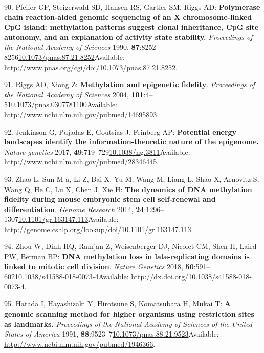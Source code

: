 \documentclass[
]{book}
\begin{document}
\leavevmode\hypertarget{ref-Pfeifer1990a}{}%
90. Pfeifer GP, Steigerwald SD, Hansen RS, Gartler SM, Riggs AD: \textbf{Polymerase chain reaction-aided genomic sequencing of an X chromosome-linked CpG island: methylation patterns suggest clonal inheritance, CpG site autonomy, and an explanation of activity state stability.} \emph{Proceedings of the National Academy of Sciences} 1990, \textbf{87}:8252--8256\href{https://doi.org/10.1073/pnas.87.21.8252}{10.1073/pnas.87.21.8252}Available: \url{http://www.pnas.org/cgi/doi/10.1073/pnas.87.21.8252}.

\leavevmode\hypertarget{ref-Riggs2004a}{}%
91. Riggs AD, Xiong Z: \textbf{Methylation and epigenetic fidelity}. \emph{Proceedings of the National Academy of Sciences} 2004, \textbf{101}:4--5\href{https://doi.org/10.1073/pnas.0307781100}{10.1073/pnas.0307781100}Available: \url{http://www.ncbi.nlm.nih.gov/pubmed/14695893}.

\leavevmode\hypertarget{ref-Jenkinson2017}{}%
92. Jenkinson G, Pujadas E, Goutsias J, Feinberg AP: \textbf{Potential energy landscapes identify the information-theoretic nature of the epigenome.} \emph{Nature genetics} 2017, \textbf{49}:719--729\href{https://doi.org/10.1038/ng.3811}{10.1038/ng.3811}Available: \url{http://www.ncbi.nlm.nih.gov/pubmed/28346445}.

\leavevmode\hypertarget{ref-Zhao2014}{}%
93. Zhao L, Sun M-a, Li Z, Bai X, Yu M, Wang M, Liang L, Shao X, Arnovitz S, Wang Q, He C, Lu X, Chen J, Xie H: \textbf{The dynamics of DNA methylation fidelity during mouse embryonic stem cell self-renewal and differentiation}. \emph{Genome Research} 2014, \textbf{24}:1296--1307\href{https://doi.org/10.1101/gr.163147.113}{10.1101/gr.163147.113}Available: \url{http://genome.cshlp.org/lookup/doi/10.1101/gr.163147.113}.

\leavevmode\hypertarget{ref-Zhou2018}{}%
94. Zhou W, Dinh HQ, Ramjan Z, Weisenberger DJ, Nicolet CM, Shen H, Laird PW, Berman BP: \textbf{DNA methylation loss in late-replicating domains is linked to mitotic cell division}. \emph{Nature Genetics} 2018, \textbf{50}:591--602\href{https://doi.org/10.1038/s41588-018-0073-4}{10.1038/s41588-018-0073-4}Available: \url{http://dx.doi.org/10.1038/s41588-018-0073-4}.

\leavevmode\hypertarget{ref-Hatada1991}{}%
95. Hatada I, Hayashizaki Y, Hirotsune S, Komatsubara H, Mukai T: \textbf{A genomic scanning method for higher organisms using restriction sites as landmarks.} \emph{Proceedings of the National Academy of Sciences of the United States of America} 1991, \textbf{88}:9523--7\href{https://doi.org/10.1073/pnas.88.21.9523}{10.1073/pnas.88.21.9523}Available: \url{http://www.ncbi.nlm.nih.gov/pubmed/1946366}.
\end{document}
